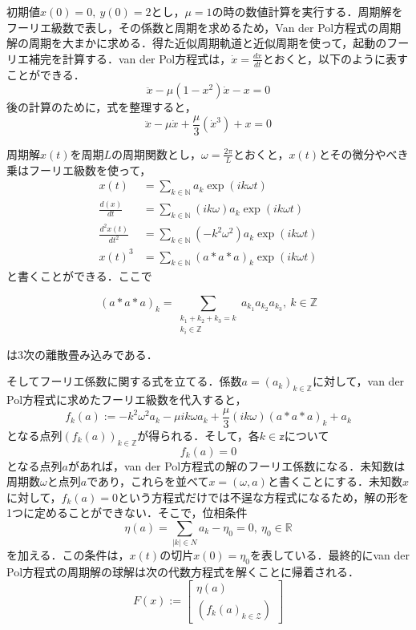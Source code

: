 \documentclass[11pt,a4paper]{jsarticle}
\theoremstyle{definition}
\begin{document}
初期値$x(0)=0,\ y(0)=2$とし，$\mu=1$の時の数値計算を実行する．周期解をフーリエ級数で表し，その係数と周期を求めるため，Van der Pol方程式の周期解の周期を大まかに求める．得た近似周期軌道と近似周期を使って，起動のフーリエ補完を計算する．van der Pol方程式は，$\dot{x}=\frac{dx}{dt}$とおくと，以下のように表すことができる．
\begin{equation*}
  \ddot{x} - \mu (1-x^2)\dot{x} - x = 0
\end{equation*}
後の計算のために，式を整理すると，
\begin{equation*}
  \ddot{x} - \mu \dot{x} + \frac{\mu}{3} \left(\dot{x}^3\right) + x = 0
\end{equation*}

周期解$x(t)$を周期$L$の周期関数とし，$\omega = \frac{2\pi}{L}$とおくと，$x(t)$とその微分やべき乗はフーリエ級数を使って，
\begin{align*}
  x(t)                 & = \sum_{k\in\mathbb{N}} a_k \exp(ik \omega t)                \\
  \frac{d(x)}{dt}      & = \sum_{k\in\mathbb{N}} (ik \omega) a_k \exp(ik \omega t)    \\
  \frac{d^2x(t)}{dt^2} & = \sum_{k\in\mathbb{N}} (-k^2\omega^2) a_k \exp(ik \omega t) \\
  x(t)^3               & = \sum_{k\in\mathbb{N}} (a*a*a)_k \exp(ik \omega t)
\end{align*}
と書くことができる．ここで

\begin{equation*}
  (a*a*a)_k = \sum_{\substack{k_1+k_2+k_3=k\\k_i\in\mathbb{Z}}} a_{k_1}a_{k_2}a_{k_3},\ k\in\mathbb{Z}
\end{equation*}

は3次の離散畳み込みである．

そしてフーリエ係数に関する式を立てる．係数$a=\left(a_k\right)_{k\in\mathbb{Z}}$に対して，van der Pol方程式に求めたフーリエ級数を代入すると，
\begin{equation*}
  f_k(a) := -k^2\omega^2 a_k - \mu ik \omega a_k + \frac{\mu}{3} (ik \omega)(a*a*a)_k + a_k
\end{equation*}
となる点列$(f_k(a))_{k\in\mathbb{Z}}$が得られる．そして，各$k\in\mathbb{z}$について
\begin{equation*}
  f_k(a) = 0
\end{equation*}
となる点列$a$があれば，van der Pol方程式の解のフーリエ係数になる．未知数は周期数$\omega$と点列$a$であり，これらを並べて$x=(\omega,a)$と書くことにする．未知数$x$に対して，$f_k(a)=0$という方程式だけでは不逞な方程式になるため，解の形を1つに定めることができない．そこで，位相条件
\begin{equation*}
  \eta(a) = \sum_{|k|\in N} a_k-\eta_0 = 0,\ \eta_0\in\mathbb{R}
\end{equation*}
を加える．この条件は，$x(t)$の切片$x(0)=\eta_0$を表している．最終的にvan der Pol方程式の周期解の球解は次の代数方程式を解くことに帰着される．
\begin{equation*}
  F(x) := \begin{bmatrix}
    \eta(a) \\
    \left(f_k(a)_{k\in\mathcal{Z}}\right)
  \end{bmatrix}
\end{equation*}
\end{document}
